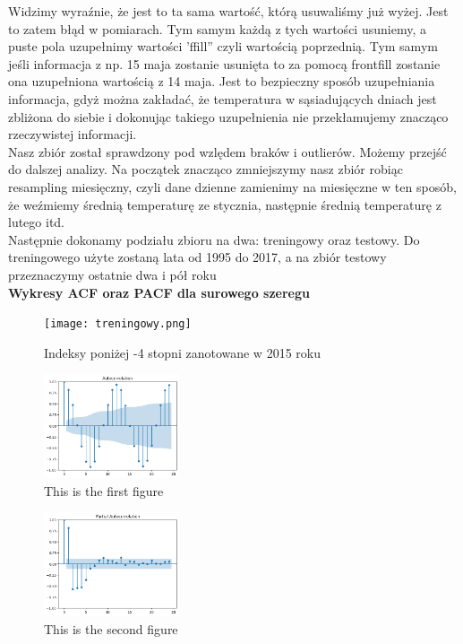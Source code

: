 \documentclass[12pt]{mwart}
\begin{document}
Widzimy wyraźnie, że jest to ta sama wartość, którą usuwaliśmy już wyżej. Jest to zatem błąd w pomiarach. Tym samym każdą z tych wartości usuniemy, a puste pola uzupełnimy wartości 'ffill'' czyli wartością poprzednią. Tym samym jeśli informacja z np. 15 maja zostanie usunięta to za pomocą frontfill zostanie ona uzupełniona wartością z 14 maja. Jest to bezpieczny sposób uzupełniania informacja, gdyż można zakładać, że temperatura w sąsiadujących dniach jest zbliżona do siebie i dokonując takiego uzupełnienia nie przekłamujemy znacząco rzeczywistej informacji.\\
Nasz zbiór został sprawdzony pod wzlędem braków i outlierów. Możemy przejść do dalszej analizy. Na początek znacząco zmniejszymy nasz zbiór robiąc resampling miesięczny, czyli dane dzienne zamienimy na miesięczne w ten sposób, że weźmiemy średnią temperaturę ze stycznia, następnie średnią temperaturę z lutego itd.\\


Następnie dokonamy podziału zbioru na dwa: treningowy oraz testowy. Do treningowego użyte zostaną lata od 1995 do 2017, a na zbiór testowy przeznaczymy ostatnie dwa i pół roku\\
\newpage
\large\textbf{Wykresy ACF oraz PACF dla surowego szeregu}\\

\begin{minipage}{\linewidth}
	\centering
	\begin{minipage}{0.45\linewidth}
	\begin{figure}[H]
		\texttt{[image: treningowy.png]}
		\caption{Indeksy poniżej -4 stopni zanotowane w 2015 roku}
	\end{figure}
	\end{minipage}
	\hspace{0.05\linewidth}
	\begin{minipage}{0.45\linewidth}
		\begin{figure}[H]
			\includegraphics[width=4cm]{acf.png}
			\caption{This is the first figure}
		\end{figure}
	\end{minipage}
	\hspace{0.05\linewidth}
	\begin{minipage}{0.45\linewidth}
		\begin{figure}[H]
			\includegraphics[width=4cm]{pacf.png}
			\caption{This is the second figure}
		\end{figure}
	\end{minipage}
\end{minipage}
\\
\end{document}
